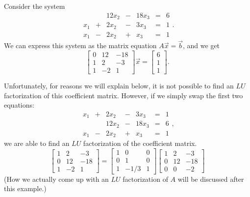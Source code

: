 \documentclass{ximera}
\begin{document}
\begin{example}\label{ex:usingLU}
Consider the system
$$\begin{array}{ccccccccc}
        & &12x_2&-&18x_3&= &6 \\
     x_1 &+ &2x_2&-&3x_3&= &1\\
      x_1&- &2x_2&+&x_3&=&1
    \end{array}.$$
We can express this system as the matrix equation $A\vec{x}=\vec{b}$, and we get $$\begin{bmatrix}0&12&-18\\1&2&-3\\1&-2&1\end{bmatrix}\vec{x}=\begin{bmatrix}6\\1\\1\end{bmatrix}.$$



 
Unfortunately, for reasons we will explain below, it is not possible to find an $LU$ factorization of this coefficient matrix.  However, if we simply swap the first two equations:
$$\begin{array}{ccccccccc}
     x_1 &+ &2x_2&-&3x_3&= &1\\
      & &12x_2&-&18x_3&= &6 \\
      x_1&- &2x_2&+&x_3&=&1
    \end{array},$$
we are able to find an $LU$ factorization of the coefficient matrix.
\[
\begin{bmatrix}
1 & 2 & -3 \\
0 & 12 & -18 \\
1 & -2 & 1\end{bmatrix}
=
\begin{bmatrix}
1 & 0 & 0 \\
0 & 1 & 0 \\
1  & -1/3  & 1
\end{bmatrix}
\begin{bmatrix}
1 & 2 & -3 \\
0 & 12  & -18 \\
0 & 0 & -2
\end{bmatrix}
\]
(How we actually come up with an  $LU$ factorization of $A$ will be discussed after this example.)
 

\end{example}
\end{document}

